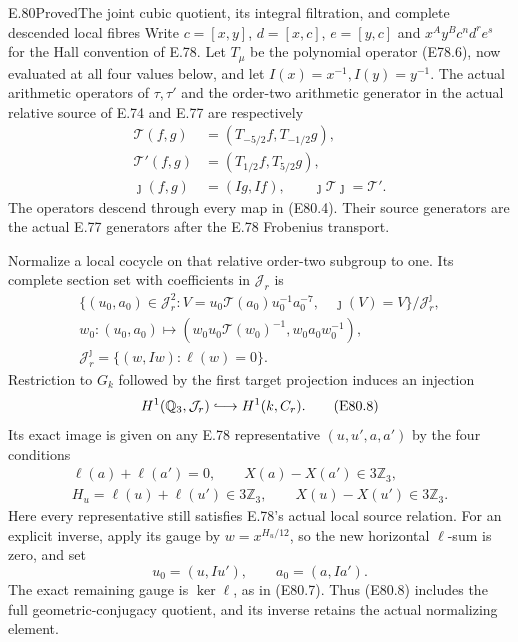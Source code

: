 \begin{statement}{E.80}{Proved}{The joint cubic quotient, its integral filtration, and complete descended local fibres}
Write $c=[x,y]$, $d=[x,c]$, $e=[y,c]$ and
$x^Ay^Bc^nd^re^s$ for the Hall convention of E.78.
Let $T_\mu$ be the polynomial operator (E78.6), now
evaluated at all four values below, and let
$I(x)=x^{-1}, I(y)=y^{-1}$. The actual arithmetic
operators of $\tau,\tau'$ and the order-two
arithmetic generator in the actual relative source
of E.74 and E.77 are respectively
\[
 \begin{aligned}
 \mathcal T(f,g)&=(T_{-5/2}f,T_{-1/2}g),\\
 \mathcal T'(f,g)&=(T_{1/2}f,T_{5/2}g),\\
 \jmath(f,g)&=(Ig,If),\qquad
              \jmath\mathcal T\jmath=\mathcal T'.
 \end{aligned}
 \tag{E80.6}
\]
The operators descend through every map in (E80.4).
Their source generators are the actual E.77
generators after the E.78 Frobenius transport.

Normalize a local cocycle on that relative
order-two subgroup to one. Its complete section
set with coefficients in $\mathcal J_r$ is
\[
 \begin{gathered}
 \{(u_0,a_0)\in\mathcal J_r^2:
       V=u_0\mathcal T(a_0)u_0^{-1}a_0^{-7},\quad
       \jmath(V)=V\}/\mathcal J_r^{\jmath},\\
 w_0:(u_0,a_0)\longmapsto
       (w_0u_0\mathcal T(w_0)^{-1},w_0a_0w_0^{-1}),\\
 \mathcal J_r^{\jmath}
       =\{(w,Iw):\ell(w)=0\}.
 \end{gathered}
 \tag{E80.7}
\]
Restriction to $G_k$ followed by the first target
projection induces an injection
\[
       H^1(\mathbb Q_3,\mathcal J_r)
                  \lhook\joinrel\longrightarrow H^1(k,C_r).
 \tag{E80.8}
\]
Its exact image is given on any E.78 representative
$(u,u',a,a')$ by the four conditions
\[
 \begin{gathered}
 \ell(a)+\ell(a')=0,\qquad X(a)-X(a')\in3\mathbb Z_3,\\
 H_u=\ell(u)+\ell(u')\in3\mathbb Z_3,
       \qquad X(u)-X(u')\in3\mathbb Z_3.
 \end{gathered}
 \tag{E80.9}
\]
Here every representative still satisfies E.78's
actual local source relation. For an explicit inverse,
apply its gauge by $w=x^{H_u/12}$, so the new
horizontal $\ell$-sum is zero, and set
\[
             u_0=(u,Iu'),\qquad a_0=(a,Ia').
 \tag{E80.10}
\]
The exact remaining gauge is $\ker\ell$, as in
(E80.7). Thus (E80.8) includes the full
geometric-conjugacy quotient, and its inverse retains
the actual normalizing element.


\end{statement}
